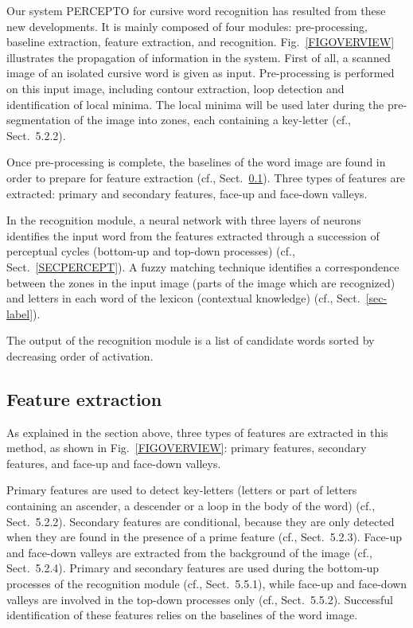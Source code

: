 \documentclass[ijdar]{svjour}
\begin{document}
Our system PERCEPTO for cursive word recognition has resulted from these new developments.
It is mainly composed of four modules: pre-processing, baseline extraction, feature extraction, and recognition.
Fig.~\ref{FIGOVERVIEW} illustrates the propagation of information in the system.
First of all, a scanned image of an isolated cursive word is given as input.
Pre-processing is performed on this input image, including contour extraction, loop detection and identification of local minima.
The local minima will be used later during the pre-segmentation of the image into zones, each containing a key-letter ({cf.},
Sect.~5.2.2).

Once pre-processing is complete, the baselines of the word image are found in order to prepare for feature extraction ({cf.},  Sect.~\ref{SECFEATURE}).
Three types of features are extracted: primary and secondary features, face-up and face-down valleys.

In the recognition module, a neural network with three layers of neurons identifies the input word from the features extracted through a succession of perceptual cycles (bottom-up and top-down processes) ({cf.},  Sect.~\ref{SECPERCEPT}).
A fuzzy matching technique identifies a correspondence between the zones in the input image (parts of the image which are recognized) and letters in each word of the lexicon (contextual knowledge) ({cf.},  Sect.~\ref{sec-label}).

The output of the recognition module is a list of candidate words sorted by decreasing order of activation.

\subsection{Feature extraction}
\label{SECFEATURE}

As explained in the section above, three types of features are extracted in this method, as shown in Fig.~\ref{FIGOVERVIEW}: primary features, secondary features, and face-up and face-down valleys.

Primary features are used to detect key-letters (letters or part of
letters containing an ascender, a descender or a loop in the body of the
word) ({cf.}, Sect.~5.2.2).  Secondary features are
conditional, because they are only detected when they are found in the
presence of a prime feature ({cf.}, Sect.~5.2.3).  Face-up and
face-down valleys are extracted from the background of the image ({cf.},
Sect.~5.2.4).  Primary and secondary features are used during the
bottom-up processes of the recognition module ({cf.},
Sect.~5.5.1), while face-up and face-down valleys are involved
in the top-down processes only ({cf.}, Sect.~5.5.2).  Successful
identification of these features relies on the baselines of the word
image.
\end{document}
